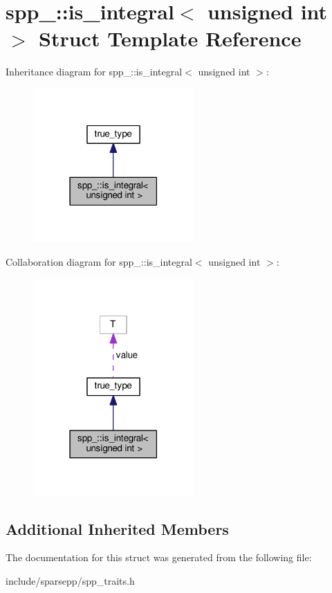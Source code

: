 \hypertarget{structspp___1_1is__integral_3_01unsigned_01int_01_4}{}\section{spp\+\_\+\+:\+:is\+\_\+integral$<$ unsigned int $>$ Struct Template Reference}
\label{structspp___1_1is__integral_3_01unsigned_01int_01_4}


Inheritance diagram for spp\+\_\+\+:\+:is\+\_\+integral$<$ unsigned int $>$\+:\nopagebreak
\begin{figure}[H]
\begin{center}
\leavevmode
\includegraphics[width=174pt]{structspp___1_1is__integral_3_01unsigned_01int_01_4__inherit__graph}
\end{center}
\end{figure}


Collaboration diagram for spp\+\_\+\+:\+:is\+\_\+integral$<$ unsigned int $>$\+:\nopagebreak
\begin{figure}[H]
\begin{center}
\leavevmode
\includegraphics[width=174pt]{structspp___1_1is__integral_3_01unsigned_01int_01_4__coll__graph}
\end{center}
\end{figure}
\subsection*{Additional Inherited Members}


The documentation for this struct was generated from the following file\+:\begin{DoxyCompactItemize}
\item 
include/sparsepp/spp\+\_\+traits.\+h\end{DoxyCompactItemize}
